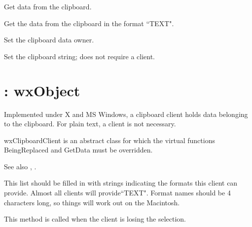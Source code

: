 
Get data from the clipboard.



Get the data from the clipboard in the format ``TEXT".



Set the clipboard data owner.



Set the clipboard string; does not require a client.



\section{: wxObject}\label{wxclipboardclient}

Implemented under X and MS Windows, a clipboard client holds data
belonging to the clipboard. For plain text, a client is not necessary.

wxClipboardClient is an abstract class for which the virtual functions
BeingReplaced and GetData must be overridden.

See also , .



This list should be filled in with strings indicating the formats
this client can provide. Almost all clients will provide``TEXT".
Format names should be 4 characters long, so things will work
out on the Macintosh.



This method is called when the client is losing the selection.


